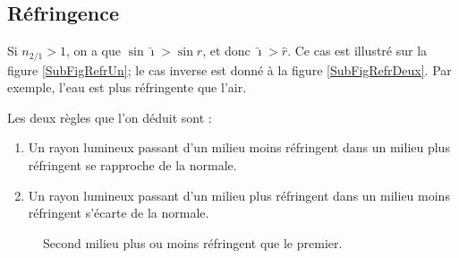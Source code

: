 \subsection{Réfringence}

Si $n_{2/1}>1$, on a que $\sin\hat\imath>\sin\hat r$, et donc $\hat\imath>\hat r$. Ce cas est illustré sur la figure \ref{SubFigRefrUn}; le cas inverse est donné à la figure \ref{SubFigRefrDeux}. Par exemple, l'eau est plus réfringente que l'air.

 Les deux règles que l'on déduit sont :
\begin{enumerate}
\item Un rayon lumineux passant d'un milieu moins réfringent dans un milieu plus réfringent se rapproche de la normale.
\item Un rayon lumineux passant d'un milieu plus réfringent dans un milieu moins réfringent s'écarte de la normale.
\end{enumerate}

\begin{figure}[ht]
\centering
{}
%
\caption{Second milieu plus ou moins réfringent que le premier.}\label{FigRefringence}
\end{figure}

